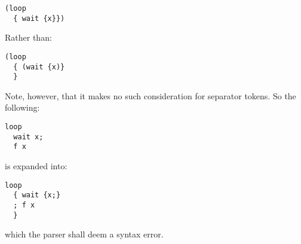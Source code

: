 \documentclass{article}
\begin{document}
\begin{lstlisting}
(loop
  { wait {x}})
\end{lstlisting}

Rather than:

\begin{lstlisting}
(loop
  { (wait {x)}
  }
\end{lstlisting}

Note, however, that it makes no such consideration for separator tokens. So the following:

\begin{lstlisting}
loop
  wait x;
  f x
\end{lstlisting}

is expanded into:

\begin{lstlisting}
loop
  { wait {x;}
  ; f x
  }
\end{lstlisting}

which the parser shall deem a syntax error.
\end{document}
